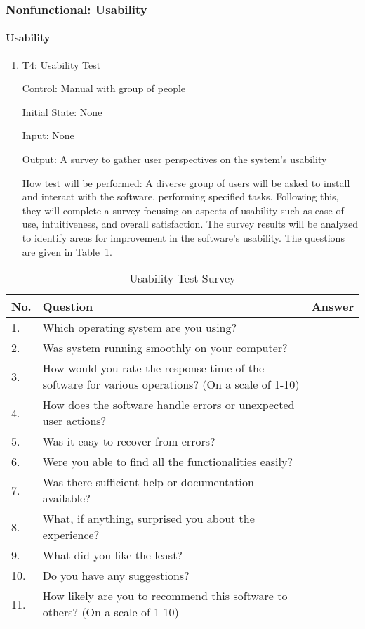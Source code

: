 \documentclass[12pt, titlepage]{article}
\begin{document}
\subsubsection{Nonfunctional: Usability} \label{NFUsability}
		
\paragraph{Usability}

\begin{enumerate}

  \item{T4: Usability Test\\}

  Control: Manual with group of people
  
  Initial State: None
  
  Input: None
  
  Output: A survey to gather user perspectives on the system's usability

  How test will be performed: A diverse group of users will be asked to install 
  and interact with the software, performing specified tasks. 
  Following this, they will complete a survey focusing on aspects of 
  usability such as ease of use, intuitiveness, and overall satisfaction. 
  The survey results will be analyzed to identify areas for improvement in the software's usability. 
  The questions are given in Table~\ref{UsabilitySurvey}.
\end{enumerate}

\begin{table}[h!]
  \begin{center}
  \begin{tabular}{ p{0.5cm}|p{10cm}|c }
  \hline
  No. &  Question   & Answer \\
  \hline
  1. & Which operating system are you using?  & \\
  2. & Was system running smoothly on your computer?  & \\
  3. & How would you rate the response time of the software for various operations? (On a scale of 1-10) & \\
  4. & How does the software handle errors or unexpected user actions? & \\
  5. & Was it easy to recover from errors? & \\
  6. & Were you able to find all the functionalities easily? & \\
  7. & Was there sufficient help or documentation available? & \\
  8. & What, if anything, surprised you about the experience? & \\
  9. & What did you like the least? & \\
  10. & Do you have any suggestions?  & \\
  11. & How likely are you to recommend this software to others? (On a scale of 1-10) & \\
  \hline
  \end{tabular}
  \caption{Usability Test Survey}
  \label{UsabilitySurvey}
  \end{center}
  \end{table}
\end{document}
